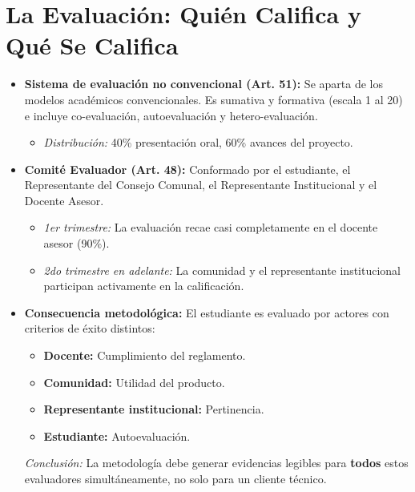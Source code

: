 \documentclass[14pt,a4paper,oneside]{extbook}
\begin{document}
\section{La Evaluación: Quién Califica y Qué Se Califica}
\begin{itemize}
    \item \textbf{Sistema de evaluación no convencional (Art. 51):} 
    Se aparta de los modelos académicos convencionales. Es sumativa y formativa (escala 1 al 20) e incluye co-evaluación, autoevaluación y hetero-evaluación. 
    \begin{itemize}
        \item \textit{Distribución:} 40\% presentación oral, 60\% avances del proyecto.
    \end{itemize}

    \item \textbf{Comité Evaluador (Art. 48):} 
    Conformado por el estudiante, el Representante del Consejo Comunal, el Representante Institucional y el Docente Asesor.
    \begin{itemize}
        \item \textit{1er trimestre:} La evaluación recae casi completamente en el docente asesor (90\%).
        \item \textit{2do trimestre en adelante:} La comunidad y el representante institucional participan activamente en la calificación.
    \end{itemize}

    \item \textbf{Consecuencia metodológica:} 
    El estudiante es evaluado por actores con criterios de éxito distintos:
    \begin{itemize}
        \item \textbf{Docente:} Cumplimiento del reglamento.
        \item \textbf{Comunidad:} Utilidad del producto.
        \item \textbf{Representante institucional:} Pertinencia.
        \item \textbf{Estudiante:} Autoevaluación.
    \end{itemize}
    \textit{Conclusión:} La metodología debe generar evidencias legibles para \textbf{todos} estos evaluadores simultáneamente, no solo para un cliente técnico.
\end{itemize}
\end{document}

